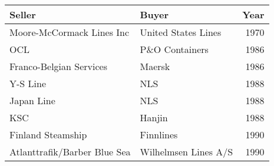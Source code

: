 
\begin{tabular}[t]{llr}
\toprule
Seller & Buyer & Year\\
\midrule
Moore-McCormack Lines Inc & United States Lines & 1970\\
OCL & P\&O Containers & 1986\\
Franco-Belgian Services & Maersk & 1986\\
Y-S Line & NLS & 1988\\
Japan Line & NLS & 1988\\
KSC & Hanjin & 1988\\
Finland Steamship & Finnlines & 1990\\
Atlanttrafik/Barber Blue Sea & Wilhelmsen Lines A/S & 1990\\
\bottomrule
\end{tabular}
